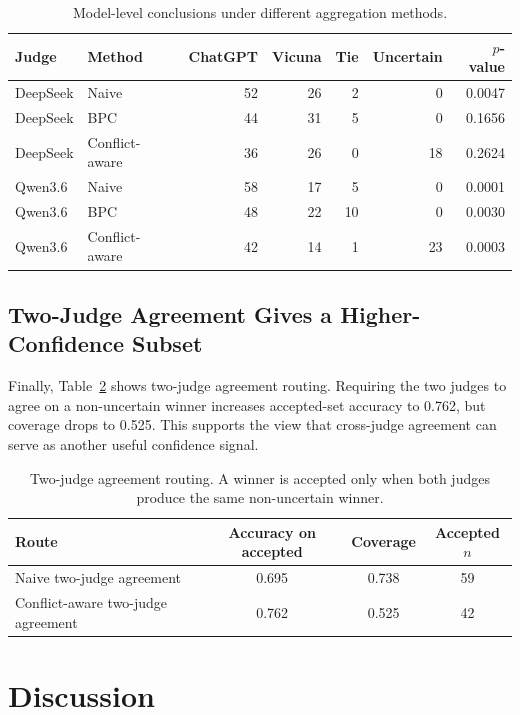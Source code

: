 \documentclass[11pt]{article}
\begin{document}
\begin{table}[h]
\centering
\begin{tabular}{llrrrrr}
\toprule
Judge & Method & ChatGPT & Vicuna & Tie & Uncertain & $p$-value \\
\midrule
DeepSeek & Naive & 52 & 26 & 2 & 0 & 0.0047 \\
DeepSeek & BPC & 44 & 31 & 5 & 0 & 0.1656 \\
DeepSeek & Conflict-aware & 36 & 26 & 0 & 18 & 0.2624 \\
\midrule
Qwen3.6 & Naive & 58 & 17 & 5 & 0 & 0.0001 \\
Qwen3.6 & BPC & 48 & 22 & 10 & 0 & 0.0030 \\
Qwen3.6 & Conflict-aware & 42 & 14 & 1 & 23 & 0.0003 \\
\bottomrule
\end{tabular}
\caption{Model-level conclusions under different aggregation methods.}
\label{tab:modellevel}
\end{table}

\subsection{Two-Judge Agreement Gives a Higher-Confidence Subset}

Finally, Table~\ref{tab:routing} shows two-judge agreement routing. Requiring the two judges to agree on a non-uncertain winner increases accepted-set accuracy to 0.762, but coverage drops to 0.525. This supports the view that cross-judge agreement can serve as another useful confidence signal.

\begin{table}[h]
\centering
\begin{tabular}{lccc}
\toprule
Route & Accuracy on accepted & Coverage & Accepted $n$ \\
\midrule
Naive two-judge agreement & 0.695 & 0.738 & 59 \\
Conflict-aware two-judge agreement & 0.762 & 0.525 & 42 \\
\bottomrule
\end{tabular}
\caption{Two-judge agreement routing. A winner is accepted only when both judges produce the same non-uncertain winner.}
\label{tab:routing}
\end{table}

\section{Discussion}
\end{document}
